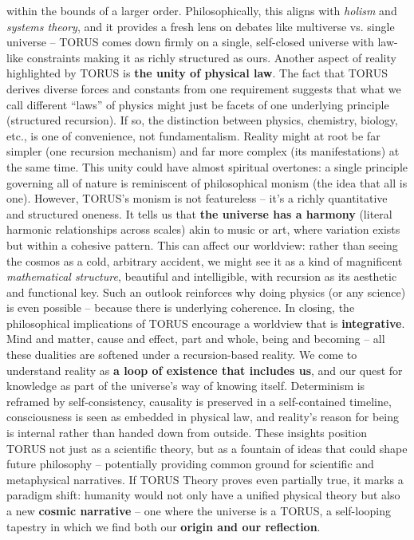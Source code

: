 \documentclass[
]{article}
\begin{document}
{\begin{itemize}
  within the bounds of a larger order. Philosophically, this aligns with
  \emph{holism} and \emph{systems theory}, and it provides a fresh lens
  on debates like multiverse vs. single universe -- TORUS comes down
  firmly on a single, self-closed universe with law-like constraints
  making it as richly structured as ours. Another aspect of reality
  highlighted by TORUS is \textbf{the unity of physical law}. The fact
  that TORUS derives diverse forces and constants from one requirement
  suggests that what we call different ``laws'' of physics might just be
  facets of one underlying principle (structured recursion). If so, the
  distinction between physics, chemistry, biology, etc., is one of
  convenience, not fundamentalism. Reality might at root be far simpler
  (one recursion mechanism) and far more complex (its manifestations) at
  the same time. This unity could have almost spiritual overtones: a
  single principle governing all of nature is reminiscent of
  philosophical monism (the idea that all is one). However, TORUS's
  monism is not featureless -- it's a richly quantitative and structured
  oneness. It tells us that \textbf{the universe has a harmony} (literal
  harmonic relationships across scales\hspace{0pt}) akin to music or
  art, where variation exists but within a cohesive pattern. This can
  affect our worldview: rather than seeing the cosmos as a cold,
  arbitrary accident, we might see it as a kind of magnificent
  \emph{mathematical structure}, beautiful and intelligible, with
  recursion as its aesthetic and functional key. Such an outlook
  reinforces why doing physics (or any science) is even possible --
  because there is underlying coherence. In closing, the philosophical
  implications of TORUS encourage a worldview that is
  \textbf{integrative}. Mind and matter, cause and effect, part and
  whole, being and becoming -- all these dualities are softened under a
  recursion-based reality. We come to understand reality as \textbf{a
  loop of existence that includes us}, and our quest for knowledge as
  part of the universe's way of knowing itself. Determinism is reframed
  by self-consistency, causality is preserved in a self-contained
  timeline, consciousness is seen as embedded in physical law, and
  reality's reason for being is internal rather than handed down from
  outside. These insights position TORUS not just as a scientific
  theory, but as a fountain of ideas that could shape future philosophy
  -- potentially providing common ground for scientific and metaphysical
  narratives. If TORUS Theory proves even partially true, it marks a
  paradigm shift: humanity would not only have a unified physical theory
  but also a new \textbf{cosmic narrative} -- one where the universe is
  a TORUS, a self-looping tapestry in which we find both our
  \textbf{origin and our reflection}.
\end{itemize}

}
\end{document}
